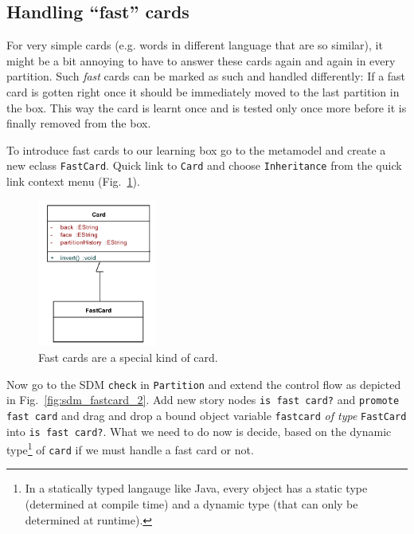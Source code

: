 \subsection{Handling ``fast'' cards}
	
For very simple cards (e.g. words in different language that are so similar), it
might be a bit annoying to have to answer these cards again and again in every
partition.  Such \emph{fast} cards can be marked as such and handled
differently:  If a fast card is gotten right once it should be immediately moved
to the last partition in the box.  This way the card is learnt once and is
tested only once more before it is finally removed from the box.

To introduce fast cards to our learning box go to the metamodel and create a new
eclass \texttt{FastCard}.  Quick link to \texttt{Card} and choose
\texttt{Inheritance} from the quick link context menu
(Fig.~\ref{fig:sdm_fastcard_1}). 

\begin{figure}[htp]
\begin{center}
  \includegraphics[width=0.35\textwidth]{pics/sdmBilder/bindings/fastcard}
  \caption{Fast cards are a special kind of card.}  
  \label{fig:sdm_fastcard_1}
\end{center}
\end{figure}

Now go to the SDM \texttt{check} in \texttt{Partition} and extend the control
flow as depicted in Fig.~\ref{fig:sdm_fastcard_2}.  Add new story nodes
\texttt{is fast card?} and \texttt{promote fast card} and drag and drop a bound
object variable \texttt{fastcard} \emph{of type} \texttt{FastCard} into
\texttt{is fast card?}.  What we need to do now is decide, based on the dynamic
type\footnote{In a statically typed langauge like Java, every object has a
static type (determined at compile time) and a dynamic type (that can only be
determined at runtime).} of \texttt{card} if we must handle a fast card or not.

